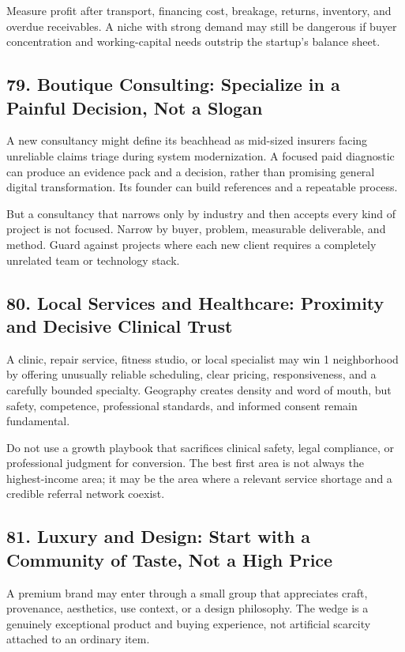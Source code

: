 Measure profit after transport, financing cost, breakage, returns, inventory, and overdue receivables. A niche with strong demand may still be dangerous if buyer concentration and working-capital needs outstrip the startup's balance sheet.

\subsection*{79. Boutique Consulting: Specialize in a Painful Decision, Not a Slogan}

A new consultancy might define its beachhead as mid-sized insurers facing unreliable claims triage during system modernization. A focused paid diagnostic can produce an evidence pack and a decision, rather than promising general digital transformation. Its founder can build references and a repeatable process.

But a consultancy that narrows only by industry and then accepts every kind of project is not focused. Narrow by buyer, problem, measurable deliverable, and method. Guard against projects where each new client requires a completely unrelated team or technology stack.

\subsection*{80. Local Services and Healthcare: Proximity and Decisive Clinical Trust}

A clinic, repair service, fitness studio, or local specialist may win 1 neighborhood by offering unusually reliable scheduling, clear pricing, responsiveness, and a carefully bounded specialty. Geography creates density and word of mouth, but safety, competence, professional standards, and informed consent remain fundamental.

Do not use a growth playbook that sacrifices clinical safety, legal compliance, or professional judgment for conversion. The best first area is not always the highest-income area; it may be the area where a relevant service shortage and a credible referral network coexist.

\subsection*{81. Luxury and Design: Start with a Community of Taste, Not a High Price}

A premium brand may enter through a small group that appreciates craft, provenance, aesthetics, use context, or a design philosophy. The wedge is a genuinely exceptional product and buying experience, not artificial scarcity attached to an ordinary item.

